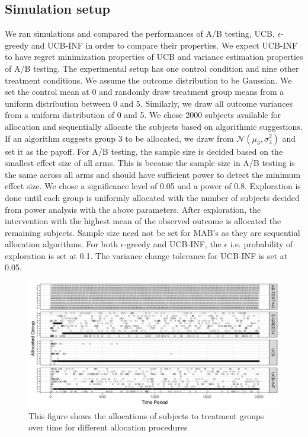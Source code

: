 \documentclass[12pt, letterpaper]{article}
\begin{document}
\subsection*{Simulation setup}

We ran simulations and compared the performances of A/B testing, UCB, $\epsilon$-greedy and UCB-INF in order to compare their properties. We expect UCB-INF to have regret minimization properties of UCB and variance estimation properties of A/B testing. The experimental setup has one control condition and nine other treatment conditions. We assume the outcome distribution to be Gaussian. We set the control mean at 0 and randomly draw treatment group means from a uniform distribution between 0 and 5. Similarly, we draw all outcome variances from a uniform distribution of 0 and 5. We chose 2000 subjects available for allocation and sequentially allocate the subjects based on algorithmic suggestions. If an algorithm suggests group 3 to be allocated, we draw from $\mathcal{N}(\mu_3,\sigma_3^2)$ and set it as the payoff.
For A/B testing, the sample size is decided based on the smallest effect size of all arms. This is because the sample size in A/B testing is the same across all arms and should have sufficient power to detect the minimum effect size. We chose a significance level of 0.05 and a power of 0.8. Exploration is done until each group is uniformly allocated with the number of subjects decided from power analysis with the above parameters. After exploration, the intervention with the highest mean of the observed outcome is allocated the remaining subjects. Sample size need not be set for MAB's as they are sequential allocation algorithms. For both $\epsilon$-greedy and UCB-INF, the $\epsilon$ i.e. probability of exploration is set at 0.1. The variance change tolerance for UCB-INF is set at 0.05.

\begin{figure}[h]
  \centering
    \includegraphics[width=\textwidth]{figs/group.png}
      \caption{This figure shows the allocations of subjects to treatment groups over time for different allocation procedures}
      \label{group}
\end{figure}
\end{document}
